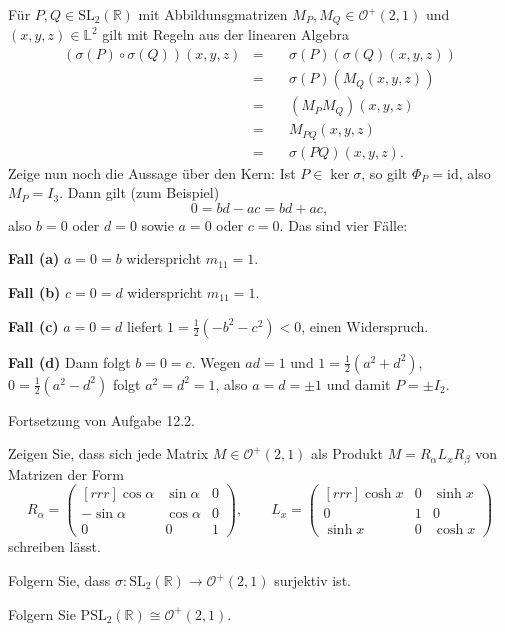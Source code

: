 \documentclass[11pt]{book}
\numberwithin{dummy}{section}
\theoremstyle{nonumberbreak}
\newenvironment{prob}[1][]{\ifthenelse{\equal{#1}{}}{\problem}{\problem[#1]}\rm}{\endproblem}
\newenvironment{sol}[1][]{\ifthenelse{\equal{#1}{}}{\solution}{\solution[#1]}\rm}{\endsolution}
\newcommand{\Loid}{\mathbb{L}}
\newcommand{\R}{\mathbb{R}}
\newcommand{\la}{\longrightarrow}
\newcommand{\id}{\mathrm{id}}
\newcommand{\Matx}[9]{\begin{pmatrix}[rrr]#1 & #2 & #3 \\ #4 & #5 & #6 \\ #7 & #8 & #9 \end{pmatrix}}
\begin{document}
\begin{spacing}{1.4}
\begin{prob}
\begin{sol}
\begin{compactenum}
\item Für $P,Q \in \mathrm{SL}_2(\R)$ mit Abbildunsgmatrizen $M_P, M_Q \in \mathcal{O}^+(2,1)$ und $(x,y,z) \in \Loid^2$ gilt mit Regeln aus der linearen Algebra
\begin{alignat*}{5}
\left( \sigma(P) \circ \sigma(Q)\right)(x,y,z)
& = && \ \sigma(P)\left( \sigma(Q)(x,y,z)\right) \\
 &=&& \ \sigma(P)(M_Q(x,y,z))\\
& =&& \ (M_P M_Q)(x,y,z)\\
 &=&& \ M_{PQ}(x,y,z)\\
 &=&& \ \sigma(PQ)(x,y,z).
 \end{alignat*}
Zeige nun noch die Aussage über den Kern: Ist $P \in \ker \sigma$, so gilt $\Phi_P=\id$, also $M_P=I_3$. Dann gilt (zum Beispiel)
$$0=bd-ac=bd+ac,$$
also $b=0$ oder $d=0$ sowie $a=0$ oder $c=0$. Das sind vier Fälle:
\begin{compactenum}
\item[\textbf{Fall (a)}] $a=0=b$ widerspricht $m_{11}=1$.
\item[\textbf{Fall (b)}] $c=0=d$ widerspricht $m_{11}=1$.
\item[\textbf{Fall (c)}] $a=0=d$ liefert $1=\frac{1}{2}(-b^2-c^2) <0$, einen Widerspruch.
\item[\textbf{Fall (d)}] Dann folgt $b=0=c$. Wegen $ad=1$ und $1=\frac{1}{2}(a^2+d^2)$, $0=\frac{1}{2}(a^2-d^2)$ folgt $a^2=d^2=1$, also $a=d=\pm 1$ und damit $P=\pm I_2$.
\end{compactenum}

\end{compactenum}
\end{sol}

\end{prob}


\begin{prob}   %
Fortsetzung von Aufgabe 12.2.
\begin{compactenum}
\item Zeigen Sie, dass sich jede Matrix $M \in \mathcal{O}^+(2,1)$ als Produkt $M=R_{\alpha} L_x R_{\beta}$ von Matrizen der Form 
$$R_{\alpha}=\Matx{\cos \alpha}{\sin \alpha}{0}{-\sin \alpha}{\cos\alpha}{0}{0}{0}{1}, \qquad L_x = \Matx{\cosh x}{0}{\sinh x}{0}{1}{0}{\sinh x}{0}{\cosh x}$$
schreiben lässt.
\item Folgern Sie, dass $\sigma: \mathrm{SL}_2(\R) \la \mathcal{O}^+(2,1)$ surjektiv ist.
\item Folgern Sie $\mathrm{PSL}_2(\R) \cong \mathcal{O}^+(2,1)$.
\end{compactenum}


\end{prob}
\end{spacing}
\end{document}
